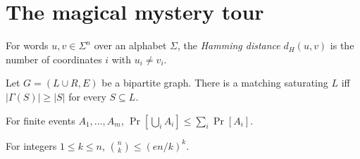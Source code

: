 %
%

\chapter{The magical mystery tour}


\begin{definition}
  \label{def:hamming-distance}
  \mathlibok
  For words $u,v\in\Sigma^n$ over an alphabet $\Sigma$, the \emph{Hamming
  distance} $d_H(u,v)$ is the number of coordinates $i$ with $u_i\neq v_i$.
\end{definition}

\begin{theorem}
  \label{thm:hall-marriage}
  \mathlibok
  Let $G=(L\cup R,E)$ be a bipartite graph. There is a matching saturating $L$
  iff $|\Gamma(S)|\ge|S|$ for every $S\subseteq L$.
\end{theorem}

\begin{lemma}
  \label{lem:union-bound}
  \mathlibok
  For finite events $A_1,\dots,A_m$, $\Pr[\bigcup_i A_i]\le\sum_i\Pr[A_i]$.
\end{lemma}

\begin{lemma}
  \label{lem:binom-bound}
  \mathlibok
  For integers $1\le k\le n$, $\binom nk\le(en/k)^k$.
\end{lemma}


